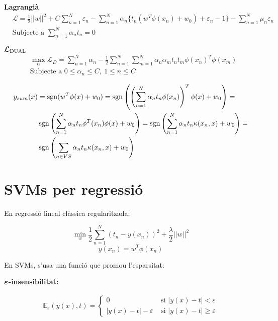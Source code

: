 \textbf{Lagrangià}
\begin{align*}
	& \mathcal{L} = \frac{1}{2} ||w||^2 + C \sum_{n=1}^N \varepsilon_n - 
	\sum_{n=1}^N \alpha_n \{ t_n (w^T \phi(x_n) + w_0) + \varepsilon_n - 1 \} -
	\sum_{n=1}^N \mu_n \varepsilon_n \\
	& \text{Subjecte a } \sum_{n=1}^N \alpha_n t_n = 0
\end{align*}

$\boldsymbol{\mathcal{L}_{\text{DUAL}}}$
\begin{align*}
	&\max_{\alpha} \mathcal{L}_D = \sum_{n=1}^N \alpha_n - \frac{1}{2}
	\sum_{n=1}^N \sum_{m=1}^N \alpha_n \alpha_m t_n t_m \phi(x_n)^T \phi(x_m)\\
	& \text{Subjecte a } 0 \le \alpha_n \le C,\ 1 \le n \le C
\end{align*}

\begin{align*}
	y_{sum}(x) &= \operatorname{sgn}(w^T \phi(x) + w_0) = 
	\operatorname{sgn}\left( \left( \sum_{n=1}^N \alpha_n t_n \phi(x_n) \right)^T 
	\phi(x) + w_0 \right) = \\
	& \operatorname{sgn} \left( \sum_{n=1}^N \alpha_n t_n \phi^T(x_n) \phi (x) + w_0 \right) = 
	\operatorname{sgn} \left( \sum_{n=1}^N \alpha_n t_n \kappa(x_n, x) + w_0 \right) = \\
	& \operatorname{sgn} \left( \sum_{n \in VS} \alpha_n t_n \kappa(x_n, x) + w_0 \right)
\end{align*}

\section{SVMs per regressió}

En regressió lineal clàssica regularitzada:

$$
\min_w \frac{1}{2} \sum_{n=1}^N (t_n - y(x_n))^2 + \frac{\lambda}{2}||w||^2
$$
$$
y(x_n) = w^T \phi(x_n)
$$

En SVMs, s'usa una funció que promou l'esparsitat:

\textbf{$\boldsymbol{\varepsilon}$-insensibilitat:}

\begin{align*}
	\mathbb{E}_\varepsilon (y(x), t) = 
	\begin{cases}
		0 & \text{ si } | y(x) - t| < \varepsilon \\
		|y(x) - t| - \varepsilon & \text{ si } |y(x) - t| \ge \varepsilon
	\end{cases}
\end{align*}

\begin{figure}[H]
	\centering
\end{figure}

